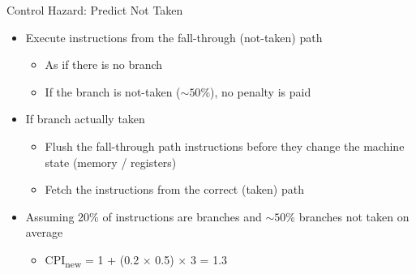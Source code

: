 \documentclass[aspectratio=169,12pt]{beamer}
\begin{document}
\begin{frame}{Control Hazard: Predict Not Taken}
    \begin{itemize}
        \item Execute instructions from the fall-through (not-taken) path
        \begin{itemize}
            \item As if there is no branch
            \item If the branch is not-taken ($\sim50\%$), no penalty is paid
        \end{itemize}
        \item If branch actually taken
        \begin{itemize}
            \item Flush the fall-through path instructions before they change the machine state (memory / registers)
            \item Fetch the instructions from the correct (taken) path
        \end{itemize}
        \item Assuming 20\% of instructions are branches and $\sim50\%$ branches not taken on average
        \begin{itemize}
            \item CPI\textsubscript{new} = 1 + (0.2 × 0.5) × 3 = 1.3
        \end{itemize}
    \end{itemize}
\end{frame}
\end{document}
